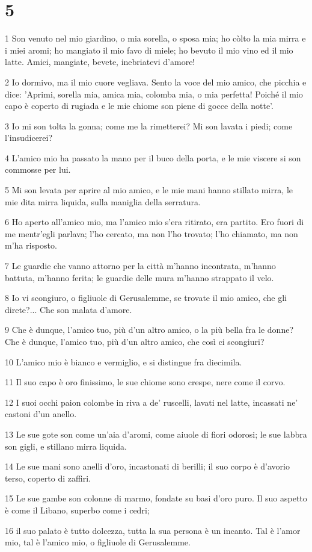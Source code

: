\chapter{5}

\par 1 Son venuto nel mio giardino, o mia sorella, o sposa mia; ho còlto la mia mirra e i miei aromi; ho mangiato il mio favo di miele; ho bevuto il mio vino ed il mio latte. Amici, mangiate, bevete, inebriatevi d'amore!
\par 2 Io dormivo, ma il mio cuore vegliava. Sento la voce del mio amico, che picchia e dice: 'Aprimi, sorella mia, amica mia, colomba mia, o mia perfetta! Poiché il mio capo è coperto di rugiada e le mie chiome son piene di gocce della notte'.
\par 3 Io mi son tolta la gonna; come me la rimetterei? Mi son lavata i piedi; come l'insudicerei?
\par 4 L'amico mio ha passato la mano per il buco della porta, e le mie viscere si son commosse per lui.
\par 5 Mi son levata per aprire al mio amico, e le mie mani hanno stillato mirra, le mie dita mirra liquida, sulla maniglia della serratura.
\par 6 Ho aperto all'amico mio, ma l'amico mio s'era ritirato, era partito. Ero fuori di me mentr'egli parlava; l'ho cercato, ma non l'ho trovato; l'ho chiamato, ma non m'ha risposto.
\par 7 Le guardie che vanno attorno per la città m'hanno incontrata, m'hanno battuta, m'hanno ferita; le guardie delle mura m'hanno strappato il velo.
\par 8 Io vi scongiuro, o figliuole di Gerusalemme, se trovate il mio amico, che gli direte?... Che son malata d'amore.
\par 9 Che è dunque, l'amico tuo, più d'un altro amico, o la più bella fra le donne? Che è dunque, l'amico tuo, più d'un altro amico, che così ci scongiuri?
\par 10 L'amico mio è bianco e vermiglio, e si distingue fra diecimila.
\par 11 Il suo capo è oro finissimo, le sue chiome sono crespe, nere come il corvo.
\par 12 I suoi occhi paion colombe in riva a de' ruscelli, lavati nel latte, incassati ne' castoni d'un anello.
\par 13 Le sue gote son come un'aia d'aromi, come aiuole di fiori odorosi; le sue labbra son gigli, e stillano mirra liquida.
\par 14 Le sue mani sono anelli d'oro, incastonati di berilli; il suo corpo è d'avorio terso, coperto di zaffiri.
\par 15 Le sue gambe son colonne di marmo, fondate su basi d'oro puro. Il suo aspetto è come il Libano, superbo come i cedri;
\par 16 il suo palato è tutto dolcezza, tutta la sua persona è un incanto. Tal è l'amor mio, tal è l'amico mio, o figliuole di Gerusalemme.

